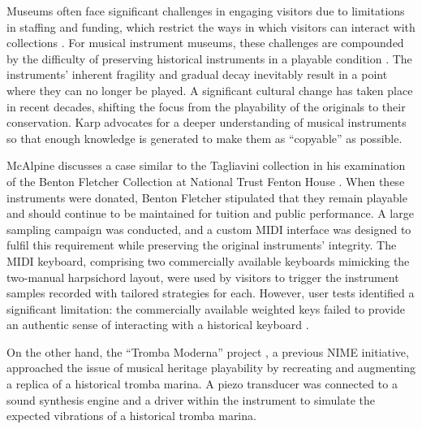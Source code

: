 Museums often face significant challenges in engaging visitors due to limitations in staffing and funding, which restrict the ways in which visitors can interact with collections \cite{Templeton2018, McAlpine2014}. For musical instrument museums, these challenges are compounded by the difficulty of preserving historical instruments in a playable condition \cite{McAlpine2014}. The instruments' inherent fragility and gradual decay inevitably result in a point where they can no longer be played. A significant cultural change has taken place in recent decades, shifting the focus from the playability of the originals to their conservation. Karp \cite{Karp1979,Karp1985} advocates for a deeper understanding of musical instruments so that enough knowledge is generated to make them as ``copyable'' as possible.

McAlpine discusses a case similar to the Tagliavini collection in his examination of the Benton Fletcher Collection at National Trust Fenton House \cite{McAlpine2014}. When these instruments were donated, Benton Fletcher stipulated that they remain playable and should continue to be maintained for tuition and public performance. A large sampling campaign was conducted, and a custom MIDI interface was designed to fulfil this requirement while preserving the original instruments' integrity. The MIDI keyboard, comprising two commercially available keyboards mimicking the two-manual harpsichord layout, were used by visitors to trigger the instrument samples recorded with tailored strategies for each. However, user tests identified a significant limitation: the commercially available weighted keys failed to provide an authentic sense of interacting with a historical keyboard \cite{McAlpine2014}. 


On the other hand, the ``Tromba Moderna'' project \cite{Baldwin2016}, a previous NIME initiative, approached the issue of musical heritage playability by recreating and augmenting a replica of a historical tromba marina. A piezo transducer was connected to a sound synthesis engine and a driver within the instrument to simulate the expected vibrations of a historical tromba marina. 

